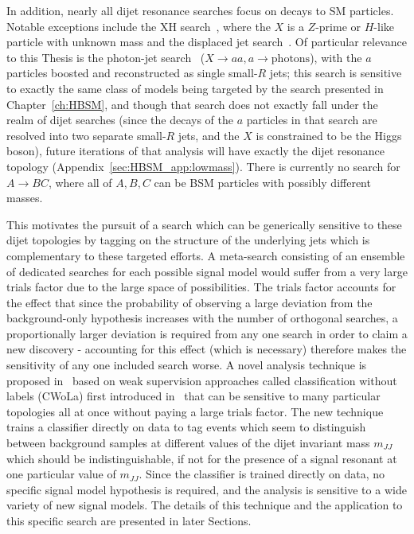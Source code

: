 In addition, nearly all dijet resonance searches focus on decays to SM particles.
Notable exceptions include the XH search~\cite{Aaboud:2018eoy,Aaboud:2017ecz}, where the $X$ is a $Z$-prime or $H$-like particle with unknown mass and the displaced jet search~\cite{Aaboud:2018aqj}.
Of particular relevance to this Thesis is the photon-jet search~\cite{Aaboud:2018djx} ($X\rightarrow aa, a\rightarrow \text{photons}$), with the $a$ particles boosted and reconstructed as single small-$R$ jets;
this search is sensitive to exactly the same class of models being targeted by the search presented in Chapter~\ref{ch:HBSM}, and though that search does not exactly fall under the realm of dijet searches (since the decays of the $a$ particles in that search are resolved into two separate small-$R$ jets, and the $X$ is constrained to be the Higgs boson),
future iterations of that analysis will have exactly the dijet resonance topology (Appendix~\ref{sec:HBSM_app:lowmass}).
There is currently no search for $A\rightarrow BC$, where all of $A,B,C$ can be BSM particles with possibly different masses.

This motivates the pursuit of a search which can be generically sensitive to these dijet topologies by tagging on the structure of the underlying jets which is complementary to these targeted efforts.
A meta-search consisting of an ensemble of dedicated searches for each possible signal model would suffer from a very large trials factor due to the large space of possibilities.
The trials factor accounts for the effect that since the probability of observing a large deviation from the background-only hypothesis increases with the number of orthogonal searches, a proportionally larger deviation is required from any one search in order to claim a new discovery - accounting for this effect (which is necessary) therefore makes the sensitivity of any one included search worse.
A novel analysis technique is proposed in~\cite{Collins:2018epr,Collins:2019jip} based on weak supervision approaches called classification without labels (CWoLa) first introduced in~\cite{Metodiev:2017vrx} that can be sensitive to many particular topologies all at once without paying a large trials factor.
The new technique trains a classifier directly on data to tag events which seem to distinguish between background samples at different values of the dijet invariant mass $m_{JJ}$ which should be indistinguishable, if not for the presence of a signal resonant at one particular value of $m_{JJ}$.
Since the classifier is trained directly on data, no specific signal model hypothesis is required, and the analysis is sensitive to a wide variety of new signal models.
The details of this technique and the application to this specific search are presented in later Sections.

